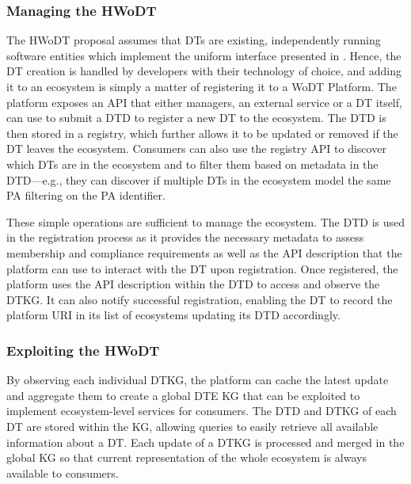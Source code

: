 \subsubsection{Managing the \acl{HWoDT}}

The \ac{HWoDT} proposal assumes that \acp{DT} are existing, independently running software entities which implement the uniform interface presented in .
%
Hence, the \ac{DT} creation is handled by developers with their technology of choice, and adding it to an ecosystem is simply a matter of registering it to a \ac{WoDT} Platform. 
%
The platform exposes an \ac{API} that either managers, an external service or a \ac{DT} itself, can use to submit a \ac{DTD} to register a new \ac{DT} to the ecosystem.
The \ac{DTD} is then stored in a registry, which further allows it to be updated or removed if the \ac{DT} leaves the ecosystem.
%
Consumers can also use the registry \ac{API} to discover which \acp{DT} are in the ecosystem and to filter them based on metadata in the \ac{DTD}---e.g., they can discover if multiple \acp{DT} in the ecosystem model the same \ac{PA} filtering on the \ac{PA} identifier.

These simple operations are sufficient to manage the ecosystem. 
%
The \ac{DTD} is used in the registration process as it provides the necessary metadata to assess membership and compliance requirements as well as the \ac{API} description that the platform can use to interact with the \ac{DT} upon registration.
% 
Once registered, the platform uses the \ac{API} description within the \ac{DTD} to access and observe the \ac{DTKG}.  
It can also notify successful registration, enabling the \ac{DT} to record the platform \ac{URI} in its list of ecosystems updating its \ac{DTD} accordingly.

\subsubsection{Exploiting the \acl{HWoDT}}

By observing each individual \ac{DTKG}, the platform can cache the latest update and aggregate them to create a global \ac{DTE} \ac{KG} that can be exploited to implement ecosystem-level services for consumers.
%
The \ac{DTD} and \ac{DTKG} of each \ac{DT} are stored within the \ac{KG}, allowing queries to easily retrieve all available information about a \ac{DT}.
%
Each update of a \ac{DTKG} is processed and merged in the global \ac{KG} so that current representation of the whole ecosystem is always available to consumers.



